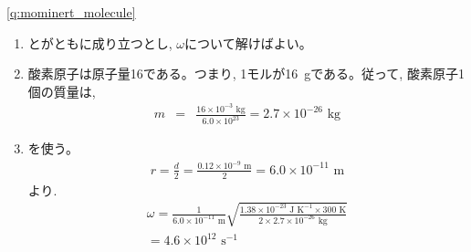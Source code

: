 \begin{q}
\ref{q:mominert_molecule}
\begin{enumerate}
\item {}とがともに成り立つとし, 
$\omega$について解けばよい。
\item 酸素原子は原子量16である。つまり, 1モルが16~gである。従って, 酸素原子1個の質量は, 
\begin{eqnarray*}
m&=&\frac{16\times10^{-3}\text{ kg}}{6.0\times10^{23}}=2.7\times10^{-26}\text{ kg}
\end{eqnarray*}
\item {}を使う。
\begin{eqnarray*}
r=\frac{d}{2}=\frac{0.12\times10^{-9}\text{ m}}{2}=6.0\times10^{-11}\text{ m}
\end{eqnarray*}
より. 
\begin{eqnarray*}
\omega=\frac{1}{6.0\times10^{-11}\text{ m}}\sqrt{\frac{1.38\times10^{-23}\text{ J K}^{-1}\times300\text{ K}}{2\times2.7\times10^{-26}\text{ kg}}}\\
=4.6\times10^{12}\text{ s}^{-1}
\end{eqnarray*}
\end{enumerate}
\mv



\end{q}
